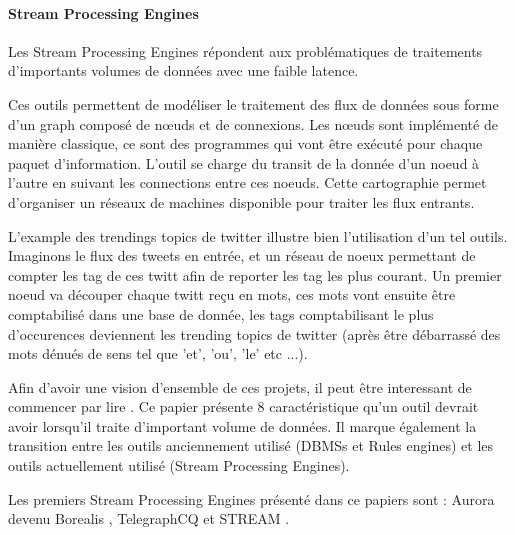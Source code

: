 \paragraph{Stream Processing Engines}
  \begin{refsection}

  Les Stream Processing Engines répondent aux problématiques de traitements d'importants volumes de données avec une faible latence.

  Ces outils permettent de modéliser le traitement des flux de données sous forme d'un graph composé de nœuds et de connexions.
  Les nœuds sont implémenté de manière classique, ce sont des programmes qui vont être exécuté pour chaque paquet d'information.
  L'outil se charge du transit de la donnée d'un noeud à l'autre en suivant les connections entre ces noeuds.
  Cette cartographie permet d'organiser un réseaux de machines disponible pour traiter les flux entrants.

  L'example des trendings topics de twitter illustre bien l'utilisation d'un tel outils.
  Imaginons le flux des tweets en entrée, et un réseau de noeux permettant de compter les tag de ces twitt afin de reporter les tag les plus courant.
  Un premier noeud va découper chaque twitt reçu en mots, ces mots vont ensuite être comptabilisé dans une base de donnée, les tags comptabilisant le plus d'occurences deviennent les trending topics de twitter (après être débarrassé des mots dénués de sens tel que 'et', 'ou', 'le' etc ...).

  Afin d'avoir une vision d'ensemble de ces projets, il peut être interessant de commencer par lire \cite{Stonebraker2005}.
  Ce papier présente 8 caractéristique qu'un outil devrait avoir lorsqu'il traite d'important volume de données. Il marque également la transition entre les outils anciennement utilisé (DBMSs et Rules engines) et les outils actuellement utilisé (Stream Processing Engines).

  Les premiers Stream Processing Engines présenté dans ce papiers sont : Aurora \cite{Abadi2003} devenu Borealis \cite{Abadi2005}, TelegraphCQ \cite{Chandrasekaran2003} et STREAM \cite{Arvind2003}.


\end{refsection}
